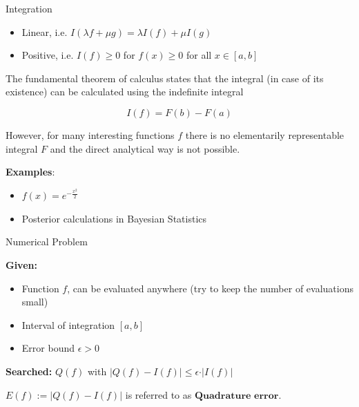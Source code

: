 \documentclass[11pt,compress,t,notes=noshow, xcolor=table]{beamer}
\begin{document}
\begin{vbframe}{Integration}
\begin{itemize}
\item Linear, i.e. $I(\lambda f + \mu g) = \lambda I(f) + \mu I(g)$
\item Positive, i.e. $I(f) \ge 0$ for $f(x) \ge 0$ for all $x \in [a, b]$
\end{itemize}

\framebreak

%

The fundamental theorem of calculus states that the integral (in case of its existence) can be calculated using the indefinite integral

$$
I(f) = F(b) - F(a)
$$

However, for many interesting functions $f$ there is no elementarily representable integral $F$ and the direct analytical way is not possible.

\lz

\vspace*{-0.4cm}
\textbf{Examples}:
\begin{itemize}
\item $f(x)=e^{-\frac{x^2}2}$
\item Posterior calculations in Bayesian Statistics
\end{itemize}
\end{vbframe}



\begin{vbframe}{Numerical Problem}

\textbf{Given:}
\begin{itemize}
\item Function $f$, can be evaluated anywhere (try to keep the number of evaluations small)
\item Interval of integration $[a, b]$
\item Error bound $\epsilon > 0$
\end{itemize}

\lz

\textbf{Searched:} $Q(f)$ with $\vert Q(f) - I(f) \vert \le \epsilon \cdot \vert I(f) \vert$

\lz

$E(f) := |Q(f) - I(f)|$ is referred to as $\textbf{Quadrature error}$.

%
\end{vbframe}
\end{document}
